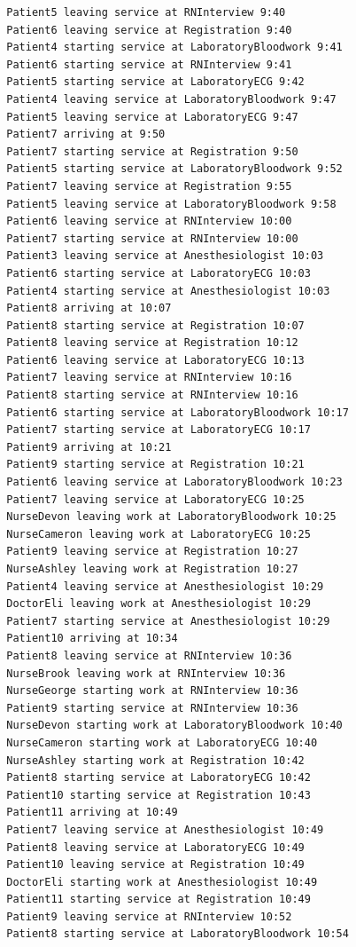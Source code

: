 \documentclass[12pt]{article}
\begin{document}
\begin{verbatim}
		Patient5 leaving service at RNInterview 9:40
		Patient6 leaving service at Registration 9:40
		Patient4 starting service at LaboratoryBloodwork 9:41
		Patient6 starting service at RNInterview 9:41
		Patient5 starting service at LaboratoryECG 9:42
		Patient4 leaving service at LaboratoryBloodwork 9:47
		Patient5 leaving service at LaboratoryECG 9:47
		Patient7 arriving at 9:50
		Patient7 starting service at Registration 9:50
		Patient5 starting service at LaboratoryBloodwork 9:52
		Patient7 leaving service at Registration 9:55
		Patient5 leaving service at LaboratoryBloodwork 9:58
		Patient6 leaving service at RNInterview 10:00
		Patient7 starting service at RNInterview 10:00
		Patient3 leaving service at Anesthesiologist 10:03
		Patient6 starting service at LaboratoryECG 10:03
		Patient4 starting service at Anesthesiologist 10:03
		Patient8 arriving at 10:07
		Patient8 starting service at Registration 10:07
		Patient8 leaving service at Registration 10:12
		Patient6 leaving service at LaboratoryECG 10:13
		Patient7 leaving service at RNInterview 10:16
		Patient8 starting service at RNInterview 10:16
		Patient6 starting service at LaboratoryBloodwork 10:17
		Patient7 starting service at LaboratoryECG 10:17
		Patient9 arriving at 10:21
		Patient9 starting service at Registration 10:21
		Patient6 leaving service at LaboratoryBloodwork 10:23
		Patient7 leaving service at LaboratoryECG 10:25
		NurseDevon leaving work at LaboratoryBloodwork 10:25
		NurseCameron leaving work at LaboratoryECG 10:25
		Patient9 leaving service at Registration 10:27
		NurseAshley leaving work at Registration 10:27
		Patient4 leaving service at Anesthesiologist 10:29
		DoctorEli leaving work at Anesthesiologist 10:29
		Patient7 starting service at Anesthesiologist 10:29
		Patient10 arriving at 10:34
		Patient8 leaving service at RNInterview 10:36
		NurseBrook leaving work at RNInterview 10:36
		NurseGeorge starting work at RNInterview 10:36
		Patient9 starting service at RNInterview 10:36
		NurseDevon starting work at LaboratoryBloodwork 10:40
		NurseCameron starting work at LaboratoryECG 10:40
		NurseAshley starting work at Registration 10:42
		Patient8 starting service at LaboratoryECG 10:42
		Patient10 starting service at Registration 10:43
		Patient11 arriving at 10:49
		Patient7 leaving service at Anesthesiologist 10:49
		Patient8 leaving service at LaboratoryECG 10:49
		Patient10 leaving service at Registration 10:49
		DoctorEli starting work at Anesthesiologist 10:49
		Patient11 starting service at Registration 10:49
		Patient9 leaving service at RNInterview 10:52
		Patient8 starting service at LaboratoryBloodwork 10:54

\end{verbatim}
\end{document}
